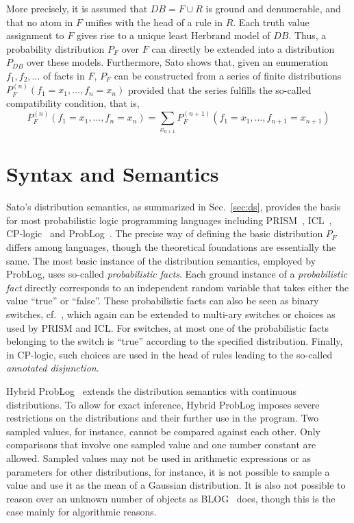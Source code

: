 \documentclass{tlp}
\begin{document}
More precisely, it is assumed that $DB = F\cup R$ is ground and
denumerable, and that no atom in $F$ unifies with the head of a rule
in $R$. Each truth value assignment to $F$ gives rise to a unique
least Herbrand model of $DB$. Thus, a probability distribution $P_F$
over $F$ can directly be extended into a distribution $P_{DB}$ over
these models. Furthermore, Sato shows that, given an enumeration
$f_1,f_2,\ldots$ of facts in $F$, $P_F$ can be constructed from a
series of finite distributions $P_F^{(n)}(f_1=x_1,\ldots, f_n=x_n)$
provided that the series fulfills the so-called compatibility
condition, that is,
\begin{equation}
  \label{eq:compat}
  P_F^{(n)}(f_1=x_1,\ldots, f_n=x_n) =
  \sum_{x_{n+1}}P_F^{(n+1)}(f_1=x_1,\ldots, f_{n+1}=x_{n+1})
\end{equation}

\section{Syntax and Semantics}
\label{sec:semantics} 

Sato's distribution semantics, as summarized in Sec.~\ref{sec:ds},
provides the basis for most probabilistic logic programming languages
including PRISM~\cite{SatoKameya:01}, ICL~\cite{Poole08},
CP-logic~\cite{Vennekens09} and ProbLog~\cite{DeRaedt07-IJCAIa}.  The
precise way of defining the basic distribution $P_F$ differs among
languages, though the theoretical foundations are essentially the
same. The most basic instance of the distribution semantics, employed
by ProbLog, uses so-called \emph{probabilistic facts}.  Each ground
instance of a \emph{probabilistic fact} directly corresponds to an
independent random variable that takes either the value ``true'' or
``false''. These probabilistic facts can also be seen as binary
switches, cf.~\cite{Sato:95}, which again can be extended to multi-ary
switches or choices as used by PRISM and ICL. For switches, at most
one of the probabilistic facts belonging to the switch is ``true''
according to the specified distribution. Finally, in CP-logic, such
choices are used in the head of rules leading to the so-called
\emph{annotated disjunction}.

Hybrid ProbLog~\cite{gutmann10ilp} extends the distribution semantics
with continuous distributions.  To allow for exact inference, Hybrid
ProbLog imposes severe restrictions on the distributions and their
further use in the program.  Two sampled values, for instance, cannot
be compared against each other. Only comparisons that involve one
sampled value and one number constant are allowed. Sampled values may
not be used in arithmetic expressions or as parameters for other
distributions, for instance, it is not possible to sample a value and
use it as the mean of a Gaussian distribution. It is also not possible
to reason over an unknown number of objects as BLOG~\cite{Milch05}
does, though this is the case mainly for algorithmic reasons.
\end{document}
